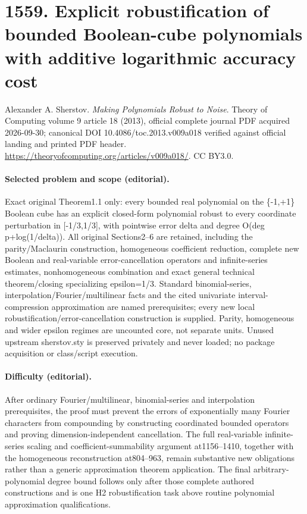 \documentclass[10pt]{article}
\theoremstyle{definition}
\numberwithin{equation}{section}
\begin{document}
\begingroup\raggedright
\section*{1559. Explicit robustification of bounded Boolean-cube polynomials with additive logarithmic accuracy cost}
Alexander A. Sherstov. \emph{Making Polynomials Robust to Noise}. Theory of Computing volume 9 article 18 (2013), official complete journal PDF acquired 2026-09-30; canonical DOI 10.4086/toc.2013.v009a018 verified against official landing and printed PDF header. \url{https://theoryofcomputing.org/articles/v009a018/}. CC BY3.0.
\paragraph{Selected problem and scope (editorial).} Exact original Theorem1.1 only: every bounded real polynomial on the \{-1,+1\} Boolean cube has an explicit closed-form polynomial robust to every coordinate perturbation in [-1/3,1/3], with pointwise error delta and degree O(deg p+log(1/delta)). All original Sections2–6 are retained, including the parity/Maclaurin construction, homogeneous coefficient reduction, complete new Boolean and real-variable error-cancellation operators and infinite-series estimates, nonhomogeneous combination and exact general technical theorem/closing specializing epsilon=1/3. Standard binomial-series, interpolation/Fourier/multilinear facts and the cited univariate interval-compression approximation are named prerequisites; every new local robustification/error-cancellation construction is supplied. Parity, homogeneous and wider epsilon regimes are uncounted core, not separate units. Unused upstream sherstov.sty is preserved privately and never loaded; no package acquisition or class/script execution.
\paragraph{Difficulty (editorial).} After ordinary Fourier/multilinear, binomial-series and interpolation prerequisites, the proof must prevent the errors of exponentially many Fourier characters from compounding by constructing coordinated bounded operators and proving dimension-independent cancellation. The full real-variable infinite-series scaling and coefficient-summability argument at1156–1410, together with the homogeneous reconstruction at804–963, remain substantive new obligations rather than a generic approximation theorem application. The final arbitrary-polynomial degree bound follows only after those complete authored constructions and is one H2 robustification task above routine polynomial approximation qualifications.
\end{document}
